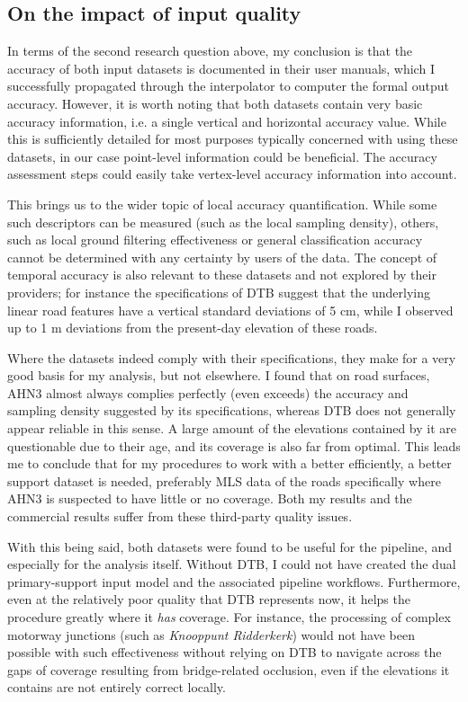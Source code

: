 \subsection{On the impact of input quality}
\label{sub:usefulnessquality}

In terms of the second research question above, my conclusion is that the accuracy of both input datasets is documented in their user manuals, which I successfully propagated through the interpolator to computer the formal output accuracy. However, it is worth noting that both datasets contain very basic accuracy information, i.e. a single vertical and horizontal accuracy value. While this is sufficiently detailed for most purposes typically concerned with using these datasets, in our case point-level information could be beneficial. The accuracy assessment steps could easily take vertex-level accuracy information into account.

This brings us to the wider topic of local accuracy quantification. While some such descriptors can be measured (such as the local sampling density), others, such as local ground filtering effectiveness or general classification accuracy cannot be determined with any certainty by users of the data. The concept of temporal accuracy is also relevant to these datasets and not explored by their providers; for instance the specifications of DTB suggest that the underlying linear road features have a vertical standard deviations of 5 cm, while I observed up to 1 m deviations from the present-day elevation of these roads.

Where the datasets indeed comply with their specifications, they make for a very good basis for my analysis, but not elsewhere. I found that on road surfaces, AHN3 almost always complies perfectly (even exceeds) the accuracy and sampling density suggested by its specifications, whereas DTB does not generally appear reliable in this sense. A large amount of the elevations contained by it are questionable due to their age, and its coverage is also far from optimal. This leads me to conclude that for my procedures to work with a better efficiently, a better support dataset is needed, preferably MLS data of the roads specifically where AHN3 is suspected to have little or no coverage. Both my results and the commercial results suffer from these third-party quality issues.

With this being said, both datasets were found to be useful for the pipeline, and especially for the analysis itself. Without DTB, I could not have created the dual primary-support input model and the associated pipeline workflows. Furthermore, even at the relatively poor quality that DTB represents now, it helps the procedure greatly where it \textit{has} coverage. For instance, the processing of complex motorway junctions (such as \textit{Knooppunt Ridderkerk}) would not have been possible with such effectiveness without relying on DTB to navigate across the gaps of coverage resulting from bridge-related occlusion, even if the elevations it contains are not entirely correct locally.

